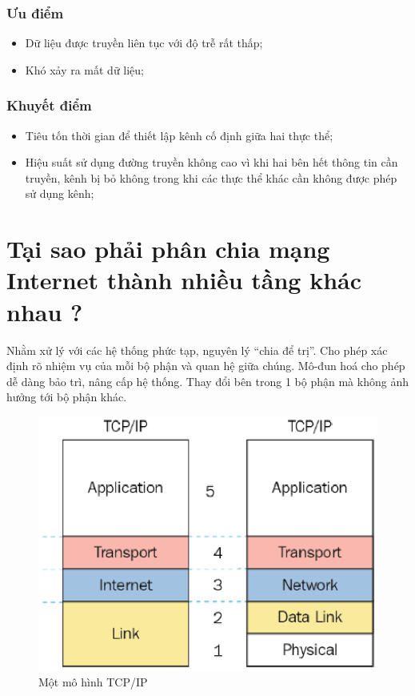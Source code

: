 \documentclass[9pt,twocolumn,twoside,lineno]{gsajnl}
\begin{document}
\subsubsection{Ưu điểm}
\begin{itemize}
  \item Dữ liệu được truyền liên tục với độ trễ rất thấp;
  \item Khó xảy ra mất dữ liệu;
\end{itemize}
\subsubsection{Khuyết điểm}
\begin{itemize}
  \item Tiêu tốn thời gian để thiết lập kênh cố định giữa hai thực thể;
  \item Hiệu suất sử dụng đường truyền không cao vì khi hai bên hết thông tin cần truyền, kênh bị bỏ không
  trong khi các thực thể khác cần không được phép sử dụng kênh;
\end{itemize}

\section{Tại sao phải phân chia mạng Internet thành nhiều tầng khác nhau ?}
Nhằm xử lý với các hệ thống phức tạp, nguyên lý “chia để trị”. Cho phép xác định rõ nhiệm vụ của mỗi bộ phận và quan hệ giữa chúng. Mô-đun hoá cho phép dễ dàng bảo trì, nâng cấp hệ thống. Thay đổi bên trong 1 bộ phận mà không ảnh hưởng tới bộ phận khác.
\begin{figure}[h]
  \centering
  \includegraphics[scale=0.5]{q2_1}
  \caption{Một mô hình TCP/IP}
\end{figure}
\end{document}
